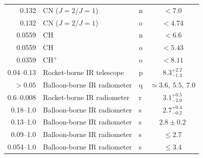 \begin{table}[htbp]
\begin{tabular}{@{}rllc@{}}
    0.132 & CN (\(J=2/J=1\)) & n & \(<7.0\)\\
    0.132 & CN (\(J=2/J=1\)) & o & \(<4.74\)\\
    0.0559 & CH & n & \(<6.6\)\\
    0.0559 & CH & o & \(<5.43\)\\
    0.0359 & \(\mathrm{CH}^+\) & o & \(<8.11\)\\
    0.04--0.13 & Rocket-borne IR telescope & p & \(8.3^{+2.2}_{-1.3}\)\\
    \(>0.05\) & Balloon-borne IR radiometer & q &
      \(\simeq3.6,\ 5.5,\ 7.0\)\\
    0.6--0.008 & Rocket-borne IR radiometer & r & \(3.1^{+0.5}_{-2.0}\)\\
    0.18--1.0 & Balloon-borne IR radiometer & s & \(2.7^{+0.4}_{-0.2}\)\\
    0.13--1.0 & Balloon-borne IR radiometer & s & \(2.8\pm0.2\)\\
    0.09--1.0 & Balloon-borne IR radiometer & s & \(\leq2.7\)\\
    0.054--1.0 & Balloon-borne IR radiometer & s & \(\leq3.4\)\\
    \bottomrule
  \end{tabular}
\end{table}
\endgroup

